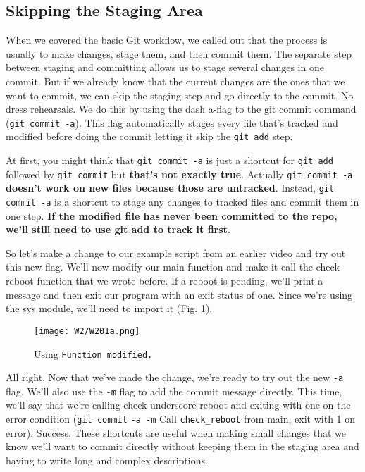 	\subsection{Skipping the Staging Area}
	
	When we covered the basic Git workflow, we called out that the process is usually to make changes, stage them, and then commit them. The separate step between staging and committing allows us to stage several changes in one commit. But if we already know that the current changes are the ones that we want to commit, we can skip the staging step and go directly to the commit. No dress rehearsals. We do this by using the dash a-flag to the git commit command (\verb|git commit -a|). This flag automatically stages every file that's tracked and modified before doing the commit letting it skip the \texttt{git add} step. 
	
	At first, you might think that \verb|git commit -a| is just a shortcut for \texttt{git add} followed by \texttt{git commit} but \textbf{that's not exactly true}. Actually \verb|git commit -a| \textbf{doesn't work on new files because those are untracked}. Instead, \verb|git commit -a| is a shortcut to stage any changes to tracked files and commit them in one step. \textbf{If the modified file has never been committed to the repo, we'll still need to use git add to track it first}. 

	So let's make a change to our example script from an earlier video and try out this new flag. We'll now modify our main function and make it call the check reboot function that we wrote before. If a reboot is pending, we'll print a message and then exit our program with an exit status of one. Since we're using the sys module, we'll need to import it (Fig. \ref{W201a}).

\begin{figure} 
	\caption{Using \texttt{Function modified.}}
	\centering
	\texttt{[image: W2/W201a.png]}
	\label{W201a}
\end{figure}
	
	
	All right. Now that we've made the change, we're ready to try out the new \verb|-a| flag. We'll also use the \verb|-m| flag to add the commit message directly. This time, we'll say that we're calling check underscore reboot and exiting with one on the error condition (\texttt{git commit} \verb|-a -m|   Call \verb|check_reboot| from main, exit with 1 on error). 
	Success. These shortcuts are useful when making small changes that we know we'll want to commit directly without keeping them in the staging area and having to write long and complex descriptions. 
	
